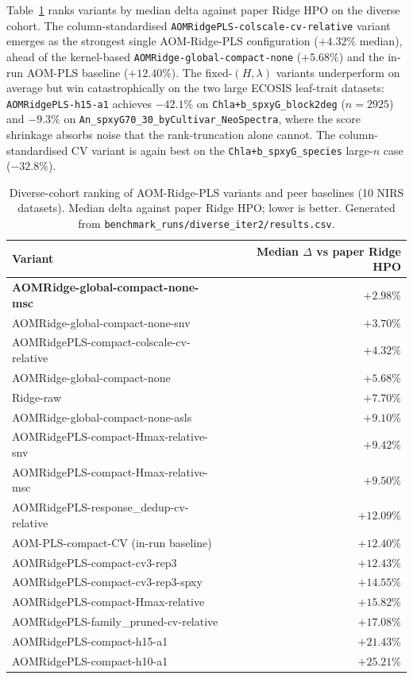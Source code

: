 \documentclass[11pt,a4paper]{article}
\begin{document}
Table~\ref{tab:rpls-headline} ranks variants by median delta against
paper Ridge HPO on the diverse cohort. The column-standardised
\texttt{AOMRidgePLS-colscale-cv-relative} variant emerges as the
strongest single AOM-Ridge-PLS configuration ($+4.32\%$ median),
ahead of the kernel-based \texttt{AOMRidge-global-compact-none}
($+5.68\%$) and the in-run AOM-PLS baseline ($+12.40\%$). The
fixed-$(H,\lambda)$ variants underperform on average but win
catastrophically on the two large ECOSIS leaf-trait datasets:
\texttt{AOMRidgePLS-h15-a1} achieves $-42.1\%$ on
\texttt{Chla+b\_spxyG\_block2deg} ($n=2925$) and $-9.3\%$ on
\texttt{An\_spxyG70\_30\_byCultivar\_NeoSpectra}, where the score
shrinkage absorbs noise that the rank-truncation alone cannot.
The column-standardised CV variant is again best on the
\texttt{Chla+b\_spxyG\_species} large-$n$ case ($-32.8\%$).

\begin{table}[t]
\centering
\caption{Diverse-cohort ranking of AOM-Ridge-PLS variants and
peer baselines (10 NIRS datasets). Median delta against paper Ridge
HPO; lower is better. Generated from
\texttt{benchmark\_runs/diverse\_iter2/results.csv}.}
\label{tab:rpls-headline}
\begin{tabular}{lr}
\toprule
Variant & Median $\Delta$ vs paper Ridge HPO \\
\midrule
\textbf{AOMRidge-global-compact-none-msc}    & $\mathbf{+2.98\%}$ \\
AOMRidge-global-compact-none-snv             & $+3.70\%$ \\
AOMRidgePLS-compact-colscale-cv-relative     & $+4.32\%$ \\
AOMRidge-global-compact-none                 & $+5.68\%$ \\
Ridge-raw                                    & $+7.70\%$ \\
AOMRidge-global-compact-none-asls            & $+9.10\%$ \\
AOMRidgePLS-compact-Hmax-relative-snv        & $+9.42\%$ \\
AOMRidgePLS-compact-Hmax-relative-msc        & $+9.50\%$ \\
AOMRidgePLS-response\_dedup-cv-relative       & $+12.09\%$ \\
AOM-PLS-compact-CV (in-run baseline)         & $+12.40\%$ \\
AOMRidgePLS-compact-cv3-rep3                 & $+12.43\%$ \\
AOMRidgePLS-compact-cv3-rep3-spxy            & $+14.55\%$ \\
AOMRidgePLS-compact-Hmax-relative            & $+15.82\%$ \\
AOMRidgePLS-family\_pruned-cv-relative        & $+17.08\%$ \\
AOMRidgePLS-compact-h15-a1                   & $+21.43\%$ \\
AOMRidgePLS-compact-h10-a1                   & $+25.21\%$ \\
\bottomrule
\end{tabular}
\end{table}
\end{document}
